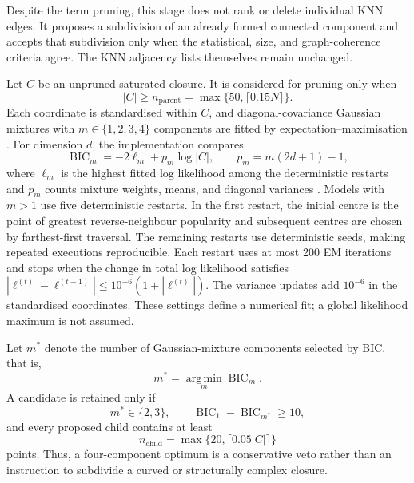 \documentclass[review,12pt]{elsarticle}
\newcommand{\argmin}{\operatorname*{arg\,min}}
\begin{document}
Despite the term pruning, this stage does not rank or delete individual KNN
edges. It proposes a subdivision of an already formed connected component and
accepts that subdivision only when the statistical, size, and graph-coherence
criteria agree. The KNN adjacency lists themselves remain unchanged.

Let $C$ be an unpruned saturated closure. It is considered for pruning only
when
\begin{equation}
|C|\geq n_{\mathrm{parent}}
=
\max\{50,\lceil0.15N\rceil\}.
\label{eq:pruning_parent_size}
\end{equation}
Each coordinate is standardised within $C$, and diagonal-covariance Gaussian
mixtures with $m\in\{1,2,3,4\}$ components are fitted by
expectation--maximisation \citep{DempsterLairdRubin1977}. For dimension $d$,
the implementation compares
\begin{equation}
\operatorname{BIC}_m
=
-2\ell_m+p_m\log |C|,
\qquad
p_m=m(2d+1)-1,
\label{eq:pruning_bic}
\end{equation}
where $\ell_m$ is the highest fitted log likelihood among the deterministic
restarts and $p_m$ counts mixture
weights, means, and diagonal variances \citep{Schwarz1978}. Models with
$m>1$ use five deterministic restarts. In the first restart, the initial
centre is the point of greatest reverse-neighbour popularity and subsequent
centres are chosen by farthest-first traversal. The remaining restarts use
deterministic seeds, making repeated executions reproducible. Each restart
uses at most 200 EM iterations and stops when the change in total log
likelihood satisfies
$|\ell^{(t)}-\ell^{(t-1)}|\leq10^{-6}(1+|\ell^{(t)}|)$.
The variance updates add $10^{-6}$ in the standardised coordinates. These
settings define a numerical fit; a global likelihood maximum is not assumed.

Let $m^*$ denote the number of Gaussian-mixture components selected by BIC,
that is,
\begin{equation}
m^*=\argmin_m\operatorname{BIC}_m.
\end{equation}
A candidate is retained only if
\begin{equation}
m^*\in\{2,3\},
\qquad
\operatorname{BIC}_1-\operatorname{BIC}_{m^*}\geq10,
\label{eq:pruning_acceptance}
\end{equation}
and every proposed child contains at least
\begin{equation}
n_{\mathrm{child}}
=
\max\{20,\lceil0.05|C|\rceil\}
\label{eq:pruning_child_size}
\end{equation}
points. Thus, a four-component optimum is a conservative veto rather than an
instruction to subdivide a curved or structurally complex closure.
\end{document}
